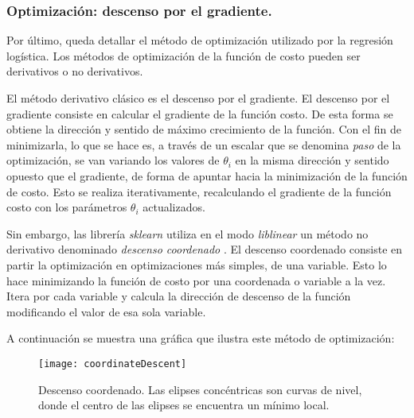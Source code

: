 \subsubsection{Optimización: descenso por el gradiente.}
Por último, queda detallar el método de optimización utilizado por la regresión logística. Los métodos de optimización de la función de costo pueden ser derivativos o no derivativos.

El método derivativo clásico es el descenso por el gradiente. El descenso por el gradiente consiste en calcular el gradiente de la función costo. De esta forma se obtiene la dirección y sentido de máximo crecimiento de la función. Con el fin de minimizarla, lo que se hace es, a través de un escalar que se denomina \textit{paso} de la optimización, se van variando los valores de $\theta_{i}$ en la misma dirección y sentido opuesto que el gradiente, de forma de apuntar hacia la minimización de la función de costo. Esto se realiza iterativamente, recalculando el gradiente de la función costo con los parámetros $\theta_{i}$ actualizados.

Sin embargo, las librería \textit{sklearn} utiliza en el modo \textit{liblinear} un método no derivativo denominado \textit{descenso coordenado} \cite{sklearnLinearModel}. El descenso coordenado consiste en partir la optimización en optimizaciones más simples, de una variable. Esto lo hace minimizando la función de costo por una coordenada o variable a la vez. Itera por cada variable y calcula la dirección de descenso de la función modificando el valor de esa sola variable.

A continuación se muestra una gráfica que ilustra este método de optimización:

\begin{figure}[H]
\centering
\texttt{[image: coordinateDescent]}
\caption{Descenso coordenado. Las elipses concéntricas son curvas de nivel, donde el centro de las elipses se encuentra un mínimo local. \cite{wikipediaCoordinateDescent}}
\label{fig:coordinateDescent}
\end{figure}




